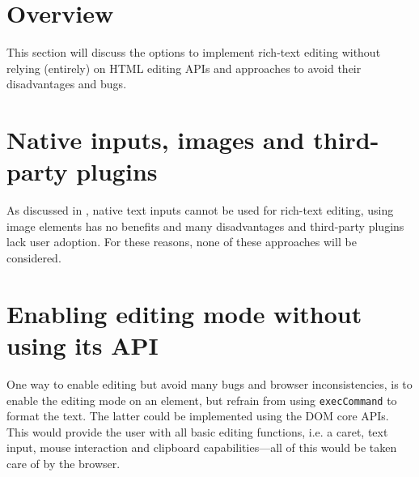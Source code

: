 


\section{Overview}
\label{sec:rich_text_approaches}



This section will discuss the options to implement rich-text editing without relying (entirely) on HTML editing APIs and approaches to avoid their disadvantages and bugs. %

\section{Native inputs, images and third-party plugins}

As discussed in , native text inputs cannot be used for rich-text editing, using image elements has no benefits and many disadvantages and third-party plugins lack user adoption. For these reasons, none of these approaches will be considered.

\section{Enabling editing mode without using its API} One way to enable editing but avoid many bugs and browser inconsistencies, is to enable the editing mode on an element, but refrain from using \texttt{execCommand} to format the text. The latter could be implemented using the DOM core APIs. This would provide the user with all basic editing functions, i.e. a caret, text input, mouse interaction and clipboard capabilities---all of this would be taken care of by the browser.

